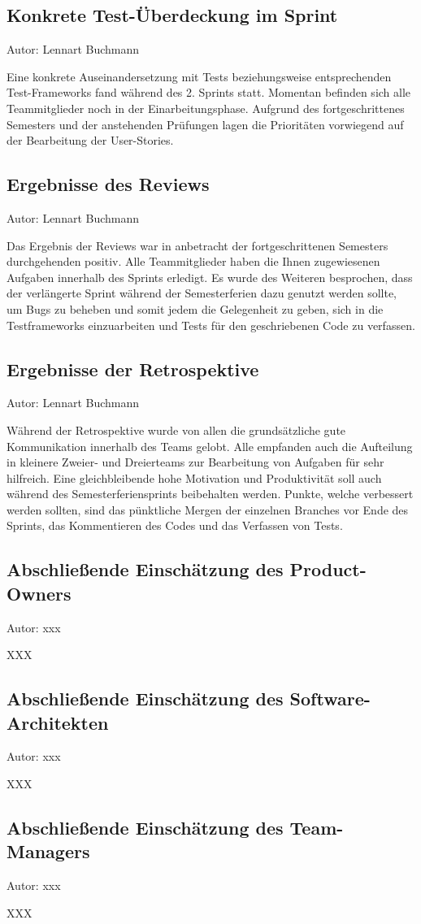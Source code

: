 \subsection{Konkrete Test-Überdeckung im Sprint}
{\small Autor: Lennart Buchmann}

Eine konkrete Auseinandersetzung mit Tests beziehungsweise entsprechenden Test-Frameworks fand während des 2. Sprints statt. Momentan befinden sich alle Teammitglieder noch in der Einarbeitungsphase. Aufgrund des fortgeschrittenes Semesters und der anstehenden Prüfungen lagen die Prioritäten vorwiegend auf der Bearbeitung der User-Stories. 


\subsection{Ergebnisse des Reviews}
{\small Autor: Lennart Buchmann}

Das Ergebnis der Reviews war in anbetracht der fortgeschrittenen Semesters durchgehenden positiv. Alle Teammitglieder haben die Ihnen zugewiesenen Aufgaben innerhalb des Sprints erledigt. 
Es wurde des Weiteren besprochen, dass der verlängerte Sprint während der Semesterferien dazu genutzt werden sollte, um Bugs zu beheben und somit jedem die Gelegenheit zu geben, sich in die Testframeworks einzuarbeiten und Tests für den geschriebenen Code zu verfassen.


\subsection{Ergebnisse der Retrospektive}
{\small Autor:  Lennart Buchmann}

Während der Retrospektive wurde von allen die grundsätzliche gute Kommunikation innerhalb des Teams gelobt. Alle empfanden auch die Aufteilung in kleinere Zweier- und Dreierteams zur Bearbeitung von Aufgaben für sehr hilfreich.  Eine gleichbleibende hohe Motivation und Produktivität soll auch während des Semesterferiensprints beibehalten werden. Punkte, welche verbessert werden sollten, sind das pünktliche Mergen der einzelnen Branches vor Ende des Sprints, das Kommentieren des Codes und das Verfassen von Tests. 


\subsection{Abschließende Einschätzung des Product-Owners}
{\small Autor: xxx}

XXX

\subsection{Abschließende Einschätzung des Software-Architekten}
{\small Autor: xxx}

XXX

\subsection{Abschließende Einschätzung des Team-Managers}
{\small Autor: xxx}

XXX

